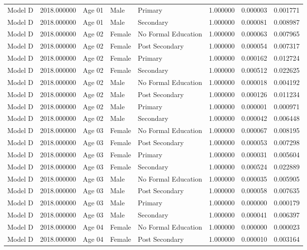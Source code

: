 \begin{table}[ht]
\begin{tabular}{lrlllrrr}
Model D & 2018.000000 & Age 01 & Male & Primary & 1.000000 & 0.000003 & 0.001771 \\
Model D & 2018.000000 & Age 01 & Male & Secondary & 1.000000 & 0.000081 & 0.008987 \\
Model D & 2018.000000 & Age 02 & Female & No Formal Education & 1.000000 & 0.000063 & 0.007965 \\
Model D & 2018.000000 & Age 02 & Female & Post Secondary & 1.000000 & 0.000054 & 0.007317 \\
Model D & 2018.000000 & Age 02 & Female & Primary & 1.000000 & 0.000162 & 0.012724 \\
Model D & 2018.000000 & Age 02 & Female & Secondary & 1.000000 & 0.000512 & 0.022625 \\
Model D & 2018.000000 & Age 02 & Male & No Formal Education & 1.000000 & 0.000018 & 0.004192 \\
Model D & 2018.000000 & Age 02 & Male & Post Secondary & 1.000000 & 0.000126 & 0.011234 \\
Model D & 2018.000000 & Age 02 & Male & Primary & 1.000000 & 0.000001 & 0.000971 \\
Model D & 2018.000000 & Age 02 & Male & Secondary & 1.000000 & 0.000042 & 0.006448 \\
Model D & 2018.000000 & Age 03 & Female & No Formal Education & 1.000000 & 0.000067 & 0.008195 \\
Model D & 2018.000000 & Age 03 & Female & Post Secondary & 1.000000 & 0.000053 & 0.007298 \\
Model D & 2018.000000 & Age 03 & Female & Primary & 1.000000 & 0.000031 & 0.005604 \\
Model D & 2018.000000 & Age 03 & Female & Secondary & 1.000000 & 0.000524 & 0.022889 \\
Model D & 2018.000000 & Age 03 & Male & No Formal Education & 1.000000 & 0.000035 & 0.005905 \\
Model D & 2018.000000 & Age 03 & Male & Post Secondary & 1.000000 & 0.000058 & 0.007635 \\
Model D & 2018.000000 & Age 03 & Male & Primary & 1.000000 & 0.000000 & 0.000179 \\
Model D & 2018.000000 & Age 03 & Male & Secondary & 1.000000 & 0.000041 & 0.006397 \\
Model D & 2018.000000 & Age 04 & Female & No Formal Education & 1.000000 & 0.000000 & 0.000023 \\
Model D & 2018.000000 & Age 04 & Female & Post Secondary & 1.000000 & 0.000010 & 0.003164 \\

\end{tabular}
\end{table}
